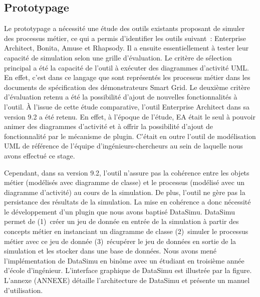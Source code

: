			\subsection{Prototypage}
				Le prototypage a nécessité une étude des outils existants proposant de 
simuler des processus métier, ce qui a permis d'identifier les outils suivant~: 
Enterprise Architect, Bonita, Amuse et Rhapsody. Il a ensuite essentiellement à 
tester leur capacité de simulation selon une grille d'évaluation. Le critère de 
sélection principal a été la capacité de l'outil à exécuter des diagrammes 
d'activité UML. En effet, c'est dans ce langage que sont représentés les 
processus métier dans les documents de spécification des démonstrateurs Smart 
Grid. Le deuxième critère d'évaluation retenu a été la possibilité d'ajout de 
nouvelles fonctionnalités à l'outil. À l'issue de cette étude comparative, 
l'outil Enterprise Architect dans sa version 9.2 a été retenu. En effet, à 
l'époque de l'étude, EA était le seul à pouvoir animer des diagrammes d'activité 
et à offrir la possibilité d'ajout de fonctionnalité par le mécanisme de plugin. 
C'était en outre l'outil de modélisation UML de référence de l'équipe 
d'ingénieurs-chercheurs au sein de laquelle nous avons effectué ce stage.
				
				Cependant, dans sa version 9.2, l'outil n'assure pas la cohérence entre les 
objets métier (modélisés avec diagramme de classe) et le processus (modélisé 
avec un diagramme d'activité) au cours de la simulation. De plus, l'outil ne 
gère pas la persistance des résultats de la simulation. La mise en cohérence a 
donc nécessité le développement d'un plugin que nous avons baptisé DataSimu. 
DataSimu permet de (1)~créer un jeu de donnée en entrée de la simulation à 
partir des concepts métier en instanciant un diagramme de classe (2)~simuler le 
processus métier avec ce jeu de donnée (3)~récupérer le jeu de données en sortie 
de la simulation et les stocker dans une base de données. Nous avons mené 
l'implémentation de DataSimu en binôme avec un étudiant en troisième année 
d'école d'ingénieur. L'interface graphique de DataSimu est illustrée par la 
figure. L'annexe (ANNEXE) détaille l'architecture de DataSimu et présente un 
manuel d'utilisation. 
				
